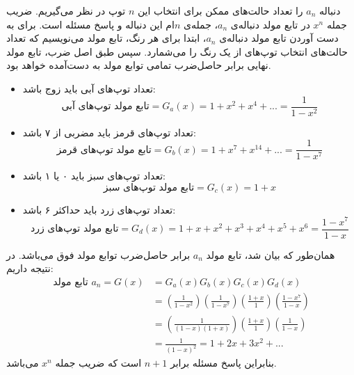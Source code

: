 \p
  دنباله 
  $a_n$ 
  را تعداد حالت‌های ممکن برای انتخاب این
  $n$
  توپ
  در نظر می‌گیریم.
  ضریب جمله
  $x^n$
  در تابع مولد
   دنباله‌ی
   $a_n$،
  ‌جمله‌ی 
  $n$ام
  این دنباله و پاسخ مسئله است.
  برای به دست آوردن تابع مولد دنباله‌ی
  $a_n$،
  ابتدا برای هر رنگ، تابع مولد می‌نویسیم که تعداد حالت‌های انتخاب‌ توپ‌های از یک رنگ را می‌شمارد. سپس طبق اصل ضرب،
  تابع مولد نهایی برابر حاصل‌ضرب تمامی توابع مولد به دست‌آمده خواهد بود.        
\begin{itemize}
    \item 
      تعداد توپ‌های آبی باید زوج باشد:
        $$\text{تابع مولد توپ‌های آبی} = G_a(x) = 1 + x^2 + x^4 + ... = \frac{1}{1 - x^2}$$
    \item 
    تعداد توپ‌‌های قرمز باید مضربی از ۷ باشد:
            $$\text{تابع مولد توپ‌های قرمز} = G_b(x) = 1 + x^7 + x^{14} + ... = \frac{1}{1 - x^7}$$

    \item 
    تعداد توپ‌های سبز باید ۰  یا ۱ باشد:
            $$\text{تابع مولد توپ‌های سبز} = G_c(x) = 1 + x$$

    \item 
    تعداد توپ‌های زرد باید حداکثر ۶ باشد:
            $$\text{تابع مولد توپ‌های زرد} = G_d(x) = 1 + x + x^2 + x^3 + x^4 + x^5 + x^6 = \frac{1 - x^7}{1 - x}$$
\end{itemize}

  \p
  همان‌طور که بیان شد، تابع مولد 
  $a_n$
  برابر حاصل‌ضرب توابع مولد فوق می‌باشد. در نتیجه داریم:
  \begin{align*}
    \text{تابع مولد $a_n$} = G(x) &= G_a(x)G_b(x)G_c(x)G_d(x)\\
    &= (\frac{1}{1 - x^2})(\frac{1}{1 - x^7})(\frac{1 + x}{1})(\frac{1 - x^7}{1 - x})\\
    &= (\frac{1}{(1 - x)(1 + x)})(\frac{1 + x}{1})(\frac{1}{1 - x})\\
    &= \frac{1}{(1 - x)^2} = 1 + 2x + 3x^2 + ...  
  \end{align*}
  \p
  بنابراین پاسخ مسئله برابر 
  $n + 1$
  است
 که ضریب جمله 
 $x^n$ 
  می‌باشد.